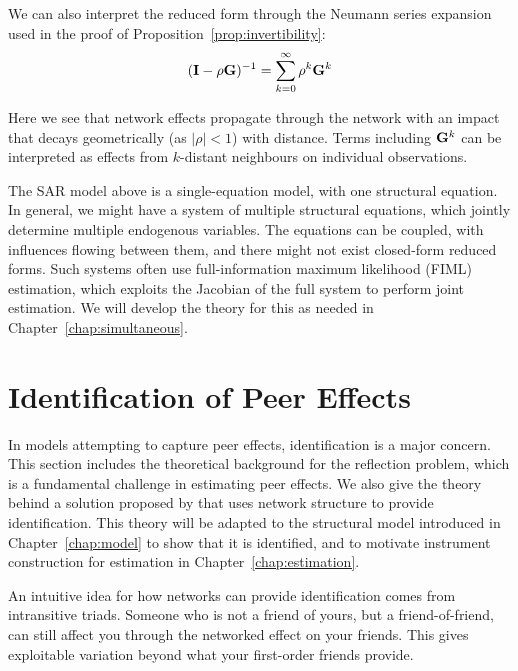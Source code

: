 We can also interpret the reduced form through the Neumann series expansion used in the proof of Proposition~\ref{prop:invertibility}:
\begin{equation}
    (\mathbf{I} - \rho\mathbf{G})^{-1} = \sum_{k=0}^{\infty} \rho^k \mathbf{G}^k
\end{equation}

Here we see that network effects propagate through the network with an impact that decays geometrically (as $|\rho| < 1$) with distance. Terms including $\mathbf{G}^k$ can be interpreted as effects from $k$-distant neighbours on individual observations.

\begin{remark}
\label{rem:simul_systems}
The SAR model above is a single-equation model, with one structural equation. In general, we might have a system of multiple structural equations, which jointly determine multiple endogenous variables. The equations can be coupled, with influences flowing between them, and there might not exist closed-form reduced forms. Such systems often use full-information maximum likelihood (FIML) estimation, which exploits the Jacobian of the full system to perform joint estimation. We will develop the theory for this as needed in Chapter~\ref{chap:simultaneous}.
\end{remark}

\section{Identification of Peer Effects}
\label{sec:bg:identification}
In models attempting to capture peer effects, identification is a major concern. This section includes the theoretical background for the reflection problem, which is a fundamental challenge in estimating peer effects. We also give the theory behind a solution proposed by \textcite{Bramoulle2009} that uses network structure to provide identification. This theory will be adapted to the structural model introduced in Chapter~\ref{chap:model} to show that it is identified, and to motivate instrument construction for estimation in Chapter~\ref{chap:estimation}.

An intuitive idea for how networks can provide identification comes from intransitive triads. Someone who is not a friend of yours, but a friend-of-friend, can still affect you through the networked effect on your friends. This gives exploitable variation beyond what your first-order friends provide.

